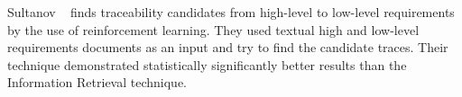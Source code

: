 Sultanov \etal~\cite{Sultanov:2013} finds traceability candidates from
high-level to low-level requirements by the use of reinforcement
learning. They used textual high and low-level requirements documents as an input and try to
find the candidate traces. Their technique demonstrated statistically
significantly better results than the Information Retrieval technique.






